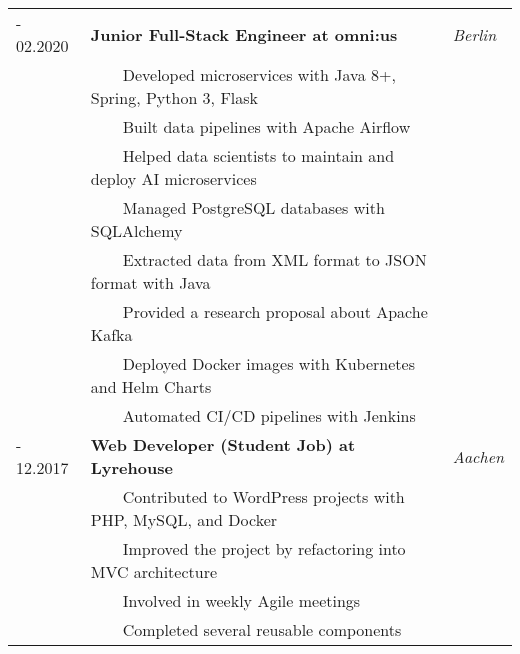 \documentclass{article}
\newcommand{\tabitem}{~~\llap{\textbullet}~~}
\begin{document}
\begin{tabularx}{\textwidth}{
        >{\hsize=0.5\hsize}X
        >{\hsize=2\hsize}X
        >{\raggedleft\arraybackslash\hsize=0.5\hsize}X
    }
    08.2018 - 02.2020 & \textbf{Junior Full-Stack Engineer at omni:us}                                                    & \textit{Berlin} \\[4pt]
                      & \tabitem Developed microservices with Java 8+, Spring, Python 3, Flask                                              \\
                      & \tabitem Built data pipelines with Apache Airflow                                                                   \\
                      & \tabitem Helped data scientists to maintain and deploy AI microservices                                             \\
                      & \tabitem Managed PostgreSQL databases with SQLAlchemy                                                               \\
                      & \tabitem Extracted data from XML format to JSON format with Java                                                    \\
                      & \tabitem Provided a research proposal about Apache Kafka                                                            \\
                      & \tabitem Deployed Docker images with Kubernetes and Helm Charts                                                     \\
                      & \tabitem Automated CI/CD pipelines with Jenkins                                                                     \\[8pt]

    02.2017 - 12.2017 & \textbf{Web Developer (Student Job) at Lyrehouse}                                                 & \textit{Aachen} \\[4pt]
                      & \tabitem Contributed to WordPress projects with PHP, MySQL, and Docker                                              \\
                      & \tabitem Improved the project by refactoring into MVC architecture                                                  \\
                      & \tabitem Involved in weekly Agile meetings                                                                          \\
                      & \tabitem Completed several reusable components
\end{tabularx}
\end{document}
